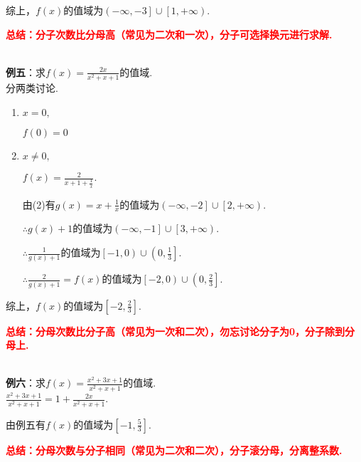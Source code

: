 \documentclass[8pt]{article}
\begin{document}
					综上，$f(x)$的值域为$\left(-\infty, -3\right]\cup\left[1,+\infty\right)$.

					\textcolor{red}{\textbf{总结：分子次数比分母高（常见为二次和一次），分子可选择换元进行求解.}}

				~\\

				\textbf{例五}：求$\displaystyle f(x)=\frac{2x}{x^2+x+1}$的值域.
					~\\

					分两类讨论.

					\begin{enumerate}[label=$\arabic*^{\circ}$]
						\item
							$x=0,$

							$f(0)=0$

						\item
							$x\neq 0,$

							$\displaystyle f(x)=\frac{2}{x+1+\frac{1}{x}}.$

							由(2)有$g(x)=x+\frac{1}{x}$的值域为$\left(-\infty,-2\right]\cup\left[2,+\infty\right).$

							$\therefore g(x)+1$的值域为$\left(-\infty,-1\right]\cup\left[3,+\infty\right).$

							$\therefore \frac{1}{g(x)+1}$的值域为$\left[-1,0\right)\cup\left(0,\frac{1}{3}\right].$

							$\therefore \frac{2}{g(x)+1}=f(x)$的值域为$\left[-2,0\right)\cup\left(0,\frac{2}{3}\right].$

					\end{enumerate}

					综上，$f(x)$的值域为$\left[-2,\frac{2}{3}\right].$

					\textcolor{red}{\textbf{总结：分母次数比分子高（常见为一次和二次），勿忘讨论分子为0，分子除到分母上.}}

				~\\

				\textbf{例六}：求$\displaystyle f(x)=\frac{x^2+3x+1}{x^2+x+1}$的值域.
					~\\

					$\displaystyle \frac{x^2+3x+1}{x^2+x+1}=1+\frac{2x}{x^2+x+1}.$

					由例五有$f(x)$的值域为$\left[-1,\frac{5}{3}\right].$

					\textcolor{red}{\textbf{总结：分母次数与分子相同（常见为二次和二次），分子滚分母，分离整系数.}}

				~\\
\end{document}
